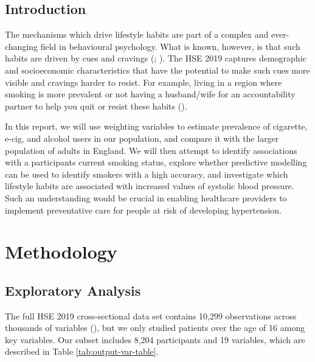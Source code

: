 \documentclass[
  11pt,
  twocolumn]{article}
\begin{document}
\subsection{Introduction}\label{introduction}

The mechanisms which drive lifestyle habits are part of a complex and
ever-changing field in behavioural psychology. What is known, however,
is that such habits are driven by cues and cravings
(;
). The HSE 2019 captures
demographic and socioeconomic characteristics that have the potential to
make such cues more visible and cravings harder to resist. For example,
living in a region where smoking is more prevalent or not having a
husband/wife for an accountability partner to help you quit or resist
these habits ().

In this report, we will use weighting variables to estimate prevalence
of cigarette, e-cig, and alcohol users in our population, and compare it
with the larger population of adults in England. We will then attempt to
identify associations with a participants current smoking status,
explore whether predictive modelling can be used to identify smokers
with a high accuracy, and investigate which lifestyle habits are
associated with increased values of systolic blood pressure. Such an
understanding would be crucial in enabling healthcare providers to
implement preventative care for people at risk of developing
hypertension.

\section{Methodology}\label{methodology}

\subsection{Exploratory Analysis}\label{exploratory-analysis}

The full HSE 2019 cross-sectional data set contains 10,299 observations
across thousands of variables (), but we only studied patients over the age of
16 among key variables. Our subset includes 8,204 participants and 19
variables, which are described in Table \ref{tab:output-var-table}.
\end{document}
